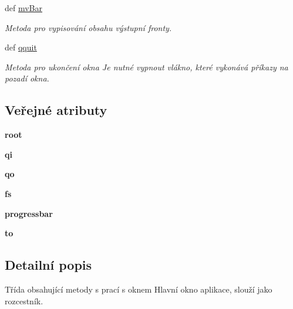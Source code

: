 \begin{DoxyCompactItemize}
def \hyperlink{classmnClean_1_1App_a7e0a0a24e1044ddb6749a380e109f84a}{mv\-Bar}
\begin{DoxyCompactList}\small\item\em Metoda pro vypisování obsahu výstupní fronty. \end{DoxyCompactList}\item 
def \hyperlink{classmnClean_1_1App_a1d63ab1d7fe79b555e86748976675a42}{qquit}
\begin{DoxyCompactList}\small\item\em Metoda pro ukončení okna Je nutné vypnout vlákno, které vykonává příkazy na pozadí okna. \end{DoxyCompactList}\end{DoxyCompactItemize}
\subsection*{Veřejné atributy}
\begin{DoxyCompactItemize}
\item 
\hypertarget{classmnClean_1_1App_ae2c3e708349860bf01847f7d91a6b68c}{{\bfseries root}}\label{dc/dd1/classmnClean_1_1App_ae2c3e708349860bf01847f7d91a6b68c}

\item 
\hypertarget{classmnClean_1_1App_aff506d49c1b70304ed8d1ab71c0867f4}{{\bfseries qi}}\label{dc/dd1/classmnClean_1_1App_aff506d49c1b70304ed8d1ab71c0867f4}

\item 
\hypertarget{classmnClean_1_1App_a2c55a4f46b8330a59ecda0d304337126}{{\bfseries qo}}\label{dc/dd1/classmnClean_1_1App_a2c55a4f46b8330a59ecda0d304337126}

\item 
\hypertarget{classmnClean_1_1App_ae6540ed7c70c2b8b8cc801159b764ceb}{{\bfseries fs}}\label{dc/dd1/classmnClean_1_1App_ae6540ed7c70c2b8b8cc801159b764ceb}

\item 
\hypertarget{classmnClean_1_1App_a3858bd0c2a0f2f9574d190501409a9e4}{{\bfseries progressbar}}\label{dc/dd1/classmnClean_1_1App_a3858bd0c2a0f2f9574d190501409a9e4}

\item 
\hypertarget{classmnClean_1_1App_a0488ae03eb3544bfd12d9a82eddfa58d}{{\bfseries to}}\label{dc/dd1/classmnClean_1_1App_a0488ae03eb3544bfd12d9a82eddfa58d}

\end{DoxyCompactItemize}


\subsection{Detailní popis}
Třída obsahující metody s prací s oknem Hlavní okno aplikace, slouží jako rozcestník. 

